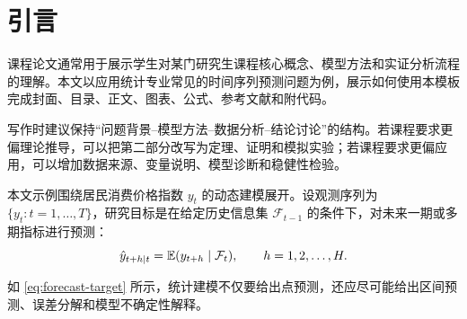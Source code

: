 \section{引言}

课程论文通常用于展示学生对某门研究生课程核心概念、模型方法和实证分析流程的理解。本文以应用统计专业常见的时间序列预测问题为例，展示如何使用本模板完成封面、目录、正文、图表、公式、参考文献和附代码。

写作时建议保持“问题背景--模型方法--数据分析--结论讨论”的结构。若课程要求更偏理论推导，可以把第二部分改写为定理、证明和模拟实验；若课程要求更偏应用，可以增加数据来源、变量说明、模型诊断和稳健性检验。

本文示例围绕居民消费价格指数 \(y_t\) 的动态建模展开。设观测序列为 \(\{y_t:t=1,\ldots,T\}\)，研究目标是在给定历史信息集 \(\mathcal{F}_{t-1}\) 的条件下，对未来一期或多期指标进行预测：
\begin{equation}
  \hat{y}_{t+h\mid t}=\mathbb{E}(y_{t+h}\mid \mathcal{F}_{t}),\qquad h=1,2,\ldots,H.
  \label{eq:forecast-target}
\end{equation}

如 \cref{eq:forecast-target} 所示，统计建模不仅要给出点预测，还应尽可能给出区间预测、误差分解和模型不确定性解释。
